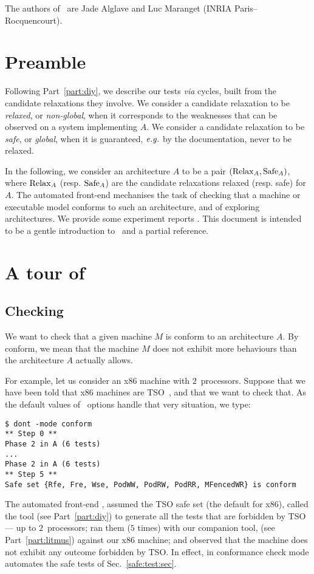 
The authors of~\dont{} are Jade Alglave and Luc Maranget
(INRIA Paris--Rocquencourt).

\section{Preamble}
Following Part~\ref{part:diy}, we describe our tests \emph{via} cycles, built
from the candidate relaxations they involve.  We consider a candidate
relaxation to be \emph{relaxed}, or \emph{non-global}, when it corresponds to
the weaknesses that can be observed on a system implementing $A$. We consider a
candidate relaxation to be \emph{safe}, or \emph{global}, when it is
guaranteed, $\mathit{e.g.}$ by the documentation, never to be relaxed.

In the following, we consider an architecture $A$ to be a pair $(\operatorname{Relax}_{A},
\operatorname{Safe}_{A})$, where $\operatorname{Relax}_{A}$ (resp.  $\operatorname{Safe}_{A}$) are the candidate
relaxations relaxed (resp. safe) for $A$.
The automated front-end \dont{} mechanises the task of checking
that a machine or executable model conforms to such an architecture, and of
exploring architectures.
We provide some experiment reports
.
This document is intended to be a gentle introduction to~\dont{} and
a partial reference.



\section{A tour of~\dont}

\subsection{Checking }
We want to check that a given machine $M$ is conform to an
architecture $A$. By conform, we mean that the machine $M$ does not exhibit
more behaviours than the architecture $A$ actually allows.

For example, let us consider an x86 machine with $2$~processors. Suppose that
we have been told that x86 machines are TSO~\cite{sparcboth}, and that we want
to check that.
As the default values of~\dont{} options handle that very situation, we type:
\begin{verbatim}
$ dont -mode conform
** Step 0 **
Phase 2 in A (6 tests)
...
Phase 2 in A (6 tests)
** Step 5 **
Safe set {Rfe, Fre, Wse, PodWW, PodRW, PodRR, MFencedWR} is conform
\end{verbatim}
The automated front-end \dont,
assumed the TSO safe set (the default for x86),
called the \diy{} tool (see Part~\ref{part:diy}) to generate
all the tests that are forbidden by TSO --- up to $2$~processors;
ran them ($5$ times) with our companion  tool, (see
Part~\ref{part:litmus}) against our x86 machine;
and observed that the machine does not exhibit any outcome
forbidden by TSO.
In effect, \dont{} in conformance check mode automates the safe
tests of Sec.~\ref{safe:test:sec}. 


